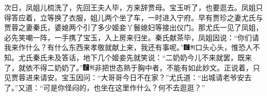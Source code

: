 次日，凤姐儿梳洗了，先回王夫人毕，方来辞贾母。宝玉听了，也要逛去。凤姐只得答应着，立等换了衣服，姐儿两个坐了车，一时进入宁府。早有贾珍之妻尤氏与贾蓉之妻秦氏，婆媳两个引了多少姬妾丫鬟媳妇等接出仪门。那尤氏一见了凤姐，必先笑嘲一阵，一手携了宝玉，入上房来归坐。秦氏献茶毕，凤姐因说：“你们请我来作什么？有什么东西来孝敬就献上来，我还有事呢。”{\includegraphics[width=3mm]{../Images/00006}\includegraphics[width=3mm]{../Images/00011}\footnotesize \kaishu 口头心头，惟恐人不知。}尤氏秦氏未及答话，地下几个姬妾先就笑说：“二奶奶今儿不来就罢，既来了，就依不得二奶奶了。”{\includegraphics[width=3mm]{../Images/00006}\includegraphics[width=3mm]{../Images/00011}\footnotesize \kaishu 非把世态熟于胸中者，不能有如此妙文。}正说着，只见贾蓉进来请安。宝玉因问：“大哥哥今日不在家？”尤氏道：“出城请老爷安去了。”又道：“可是你怪闷的，也坐在这里作什么？何不去逛逛？”

